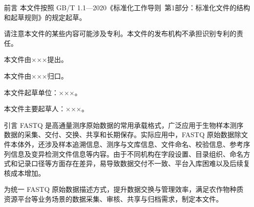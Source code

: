 \begin{preamble}{前言}
本文件按照 GB/T 1.1—2020《标准化工作导则\ 第1部分：标准化文件的结构和起草规则》的规定起草。

请注意本文件的某些内容可能涉及专利。本文件的发布机构不承担识别专利的责任。

本文件由×××提出。

本文件由×××归口。

本文件起草单位：×××。

本文件主要起草人：×××。
\end{preamble}

\begin{preamble}{引言}
FASTQ 是高通量测序原始数据的常用承载格式，广泛应用于生物样本测序数据的采集、交付、交换、共享和长期保存。实际应用中，FASTQ 原始数据除文件本体外，还涉及样本追溯信息、测序与文库信息、文件命名、校验信息、参考序列信息及变异检测文件信息等内容。由于不同机构在字段设置、目录组织、命名方式和记录口径等方面存在差异，易导致数据交付不一致、平台入库困难以及后续复核成本增加。

为统一 FASTQ 原始数据描述方式，提升数据交换与管理效率，满足农作物种质资源平台等业务场景的数据采集、审核、共享与归档需求，制定本文件。
\end{preamble}
